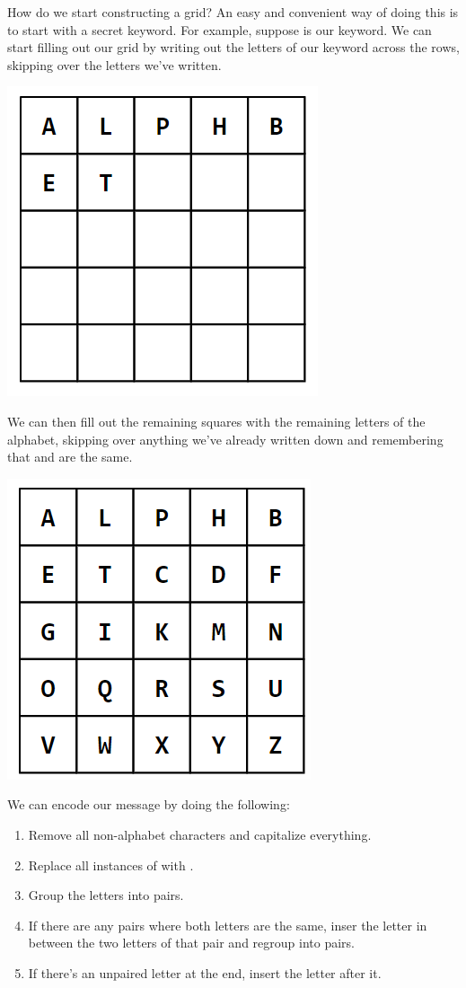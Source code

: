 \documentclass[letterpaper]{article}
\begin{document}
How do we start constructing a grid? An easy and convenient way of doing this is to start with a secret keyword. For example, suppose  is our keyword. We can start filling out our grid by writing out the letters of our keyword across the rows, skipping over the letters we've written.
\begin{center}
    \includegraphics[scale=0.5]{../assets/playfair_1.png}
\end{center}
We can then fill out the remaining squares with the remaining letters of the alphabet, skipping over anything we've already written down and remembering that  and  are the same. 
\begin{center}
    \includegraphics[scale=0.5]{../assets/playfair_2.png}
\end{center}
We can encode our message by doing the following: 
\begin{enumerate}
    \item Remove all non-alphabet characters and capitalize everything.
    \item Replace all instances of  with . 
    \item Group the letters into pairs. 
    \item If there are any pairs where both letters are the same, inser the letter  in between the two letters of that pair and regroup into pairs. 
    \item If there's an unpaired letter at the end, insert the letter  after it.
\end{enumerate}
\end{document}

